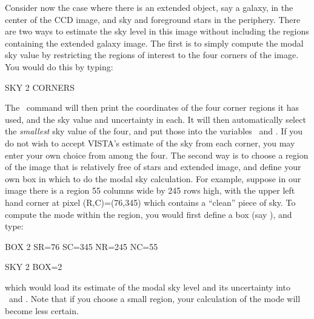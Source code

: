 Consider now the case where there is an extended object, say a galaxy, in the
center of the CCD image, and sky and foreground stars in the periphery. There
are two ways to estimate the sky level in this image without including the
regions containing the extended galaxy image.  The first is to simply compute
the modal sky value by restricting the regions of interest to the four corners
of the image.  You would do this by typing: 
\begin{command}
       \item SKY 2 CORNERS
\end{command} 
The \ command will then print the coordinates of the four corner
regions it has used, and the sky value and uncertainty in each.  It will then
automatically select the {\it smallest} sky value of the four, and put those
into the variables \ and .  If you do not wish to
accept VISTA's estimate of the sky from each corner, you may enter your own
choice from among the four.  The second way is to choose a region of the
image that is relatively free of stars and extended image, and define
your own box in which to do the modal sky calculation.  For example, suppose
in our image there is a region 55 columns wide by 245 rows high, with the
upper left hand corner at pixel (R,C)=(76,345) which contains a ``clean''
piece of sky.  To compute the mode within the region, you would first define
a box (say ), and type:
\begin{command}
      \item BOX 2 SR=76 SC=345 NR=245 NC=55
      \item SKY 2 BOX=2
\end{command}
which would load its estimate of the modal sky level and its uncertainty into
\ and .  Note that if you choose a small region, your
calculation of the mode will become less certain.

